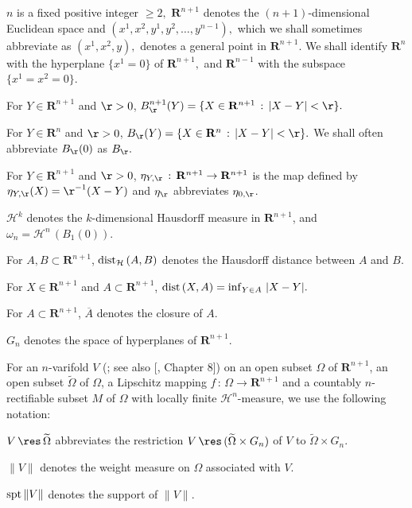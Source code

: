 \documentclass[a4paper,11pt]{amsart}
\begin{document}
$n$ is a fixed positive integer $\geq 2,$  ${\mathbf R}^{n+1}$ denotes the $(n+1)$-dimensional Euclidean space and 
$(x^{1}, x^{2}, y^{1}, y^{2}, \ldots, y^{n-1}),$ which we shall sometimes abbreviate  as 
$(x^{1}, x^{2}, y),$ denotes a general point in ${\mathbf R}^{n+1}$. We shall identify 
${\mathbf R}^{n}$ with the hyperplane $\{x^{1} = 0\}$ of ${\mathbf R}^{n+1},$ and ${\mathbf R}^{n-1}$ with the subspace 
$\{x^{1} = x^{2} = 0\}.$

For $Y \in {\mathbf R}^{n+1}$ and $\r >0$, $B_{\r}^{n+1}(Y) = \{X \in {\mathbf R}^{n+1} \, : \, |X - Y| < \r\}.$

For $Y \in {\mathbf R}^{n}$ and $\r >0$, $B_{\r}(Y) = \{X \in {\mathbf R}^{n} \, : \, |X -Y| < \r\}.$ We shall often abbreviate $B_{\r}(0)$ as $B_{\r}.$

For $Y \in {\mathbf R}^{n+1}$ and $\r>0$, $\eta_{Y, \r} \, : \, {\mathbf R}^{n+1} \to {\mathbf R}^{n+1}$ is the map defined by 
$\eta_{Y, \r}(X) = \r^{-1}(X - Y)$ and $\eta_{\r}$ abbreviates $\eta_{0, \r}$.

${\mathcal H}^{k}$ denotes the $k$-dimensional Hausdorff measure in ${\mathbf R}^{n+1}$, and 
$\omega_{n} = {\mathcal H}^{n} \, (B_{1}(0)).$

For $A, B \subset {\mathbf R}^{n+1}$, ${\rm dist}_{\mathcal H} \, (A, B)$ denotes the Hausdorff distance between $A$ and $B$.  

For $X \in {\mathbf R}^{n+1}$ and $A \subset {\mathbf R}^{n+1}$, ${\rm dist} \, (X, A) = \inf_{Y \in A} \, |X - Y|.$

For $A \subset {\mathbf R}^{n+1}$, $\overline{A}$ denotes the closure of $A$.

$G_{n}$ denotes the space of hyperplanes of ${\mathbf R}^{n+1}.$ 


 For an $n$-varifold $V$ (\cite{AW}; see also [\cite{S1}, Chapter 8]) on an open subset $\Omega$ of ${\mathbf R}^{n+1}$, an open subset $\widetilde{\Omega}$ of $\Omega$, a Lipschitz mapping $f \, : \, \Omega \to {\mathbf R}^{n+1}$ and a countably $n$-rectifiable subset $M$ of $\Omega$ with locally finite ${\mathcal H}^{n}$-measure, we use the following notation:

$V \, \res \,\widetilde{\Omega}$ abbreviates the restriction $V \, \res \, (\widetilde{\Omega} \times G_{n})$ of $V$ to $\widetilde{\Omega} \times G_{n}.$

$\|V\|$ denotes the weight measure on $\Omega$ associated with $V$. 

${\rm spt} \, \|V\|$ denotes the support of $\|V\|.$ 
\end{document}
